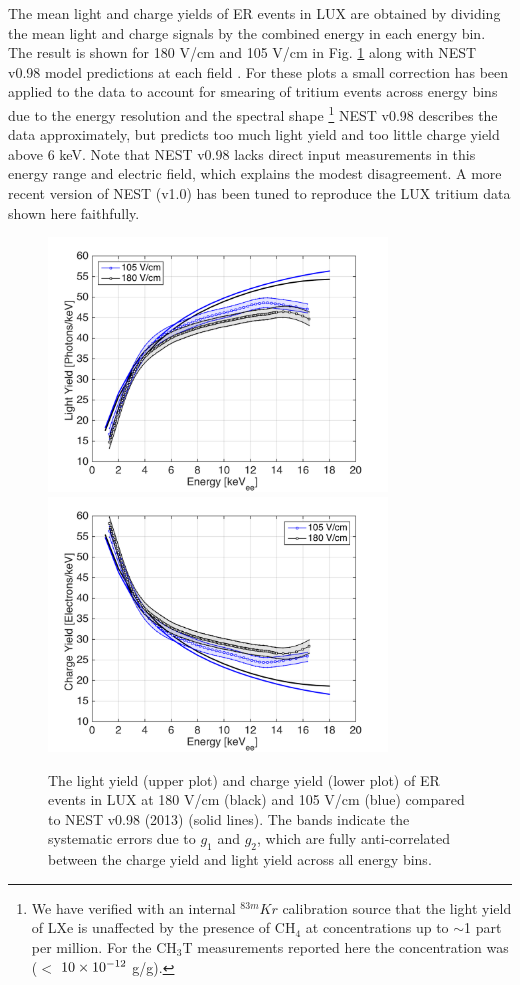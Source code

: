 The mean light and charge yields of ER events in LUX are obtained by dividing the mean light and charge signals by the combined energy in each energy bin. The result is shown for 180 V/cm and 105 V/cm in Fig. \ref{fig:ER-LY-QY} along with NEST v0.98 model predictions at each field \cite{NEST_2013}. For these plots a small correction has been applied to the data to account for smearing of tritium events across energy bins due to the energy resolution and the spectral shape \cite{Dobi_Thesis}\footnote{We have verified with an internal $^{83m}Kr$ calibration source that the light yield of LXe is unaffected by the presence of CH$_4$ at concentrations up to $\sim$1 part per million. For the CH$_3$T measurements reported here the concentration was ($<$ $\rm10\times10^{-12}$ g/g). } NEST v0.98 describes the data approximately, but predicts too much light yield and too little charge yield above 6 keV. Note that NEST v0.98 lacks direct input measurements in this energy range and electric field, which explains the modest disagreement.  A more recent version of NEST (v1.0) has been tuned to reproduce the LUX tritium data shown here faithfully.

\begin{figure}[h!]\centering
\includegraphics[width=90mm]{fig/ER_LY.png}
\includegraphics[width=90mm]{fig/ER_QY.png}
\caption{The light yield (upper plot) and charge yield (lower plot) of ER events in LUX at 180 V/cm (black) and 105 V/cm (blue) compared to NEST v0.98 (2013) (solid lines)\cite{NEST_2013}. The bands indicate the systematic errors due to $g_1$ and $g_2$, which are fully anti-correlated between the charge yield and light yield across all energy bins. }
\label{fig:ER-LY-QY}
\end{figure}

